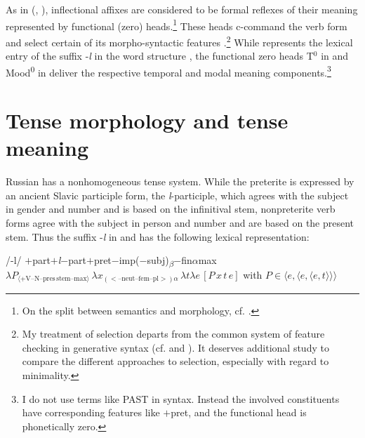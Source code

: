 \documentclass[output=paper,colorlinks,citecolor=brown]{langscibook}
\begin{document}
\begin{otherlanguage}{english}
As in \citeauthor{Pitsch2014} (\citeyear{Pitsch2013}, \citeyear{Pitsch2014}), inflectional affixes are considered to be formal reflexes of their meaning represented by functional (zero) heads.\footnote{On the split between semantics and morphology, cf. \textcite[section 8]{Stechow2012}.
} These heads \mbox{c-command} the verb form and select certain of its morpho-syntactic features \citep[cf.][]{Sternefeld2006}.\footnote{My treatment of selection departs from the common system of feature checking in generative syntax (cf. \citealt[section 8]{Stechow2012} and \citealt{Ambar2016}). It deserves additional study to compare the different approaches to selection, especially with regard to minimality.
} While  represents the lexical entry of the suffix -\textit{l} in the word structure , the functional zero heads T$^0$ in  and Mood\textsuperscript{0} in  deliver the respective temporal and modal meaning components.\footnote{I do not use terms like PAST in syntax. Instead the involved constituents have corresponding features like $+$pret, and the functional head is phonetically zero.
}
 

\section{Tense morphology and tense meaning}

Russian has a nonhomogeneous tense system. While the preterite is expressed by an ancient Slavic participle form, the \textit{l}-participle, which agrees with the subject in gender and number and is based on the infinitival stem, nonpreterite verb forms agree with the subject in person and number and are based on the present stem. Thus the suffix -\textit{l} in  and  has the following lexical representation:

\begin{exe}
\ex	\label{ex:16:5}
\begin{xlist}
	\ex  /-l/
    \ex $+$part$+$\textit{l}$-$part$+$pret$-$imp($-$subj)\textsubscript{$\beta$}$-$fin$\alpha$max \label{takjest}
    \ex $\lambda P_{\langle +\text{V}–\text{N}–\text{pres} \, \text{stem–max}\rangle} \, \lambda x_{(<–\text{neut}–\text{fem}–\text{pl}>)\alpha} \, \lambda t\lambda e \, [P \, x \, t \, e]$ \newline
    with $P \in \langle e, \langle e, \langle e,t \rangle\rangle\rangle$ \label{truskawka}
\end{xlist}
\end{exe}


\end{otherlanguage}
\end{document}
